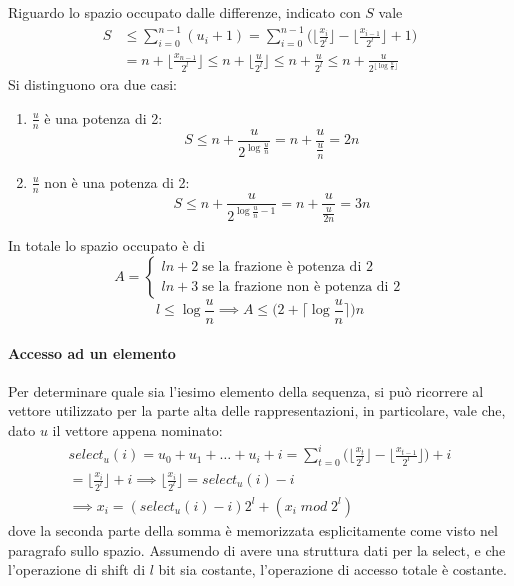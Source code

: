 Riguardo lo spazio occupato dalle differenze, indicato con $S$ vale
\begin{equation}
    \begin{aligned}
        S &\leq \sum_{i=0}^{n-1} ( u_i + 1) = \sum_{i=0}^{n-1} \bigg( \bigg\lfloor \frac{x_i}{2^l} 
        \bigg\rfloor -\bigg\lfloor \frac{x_{i-1}}{2^l} \bigg\rfloor  + 1\bigg) \\&=
        n + \bigg\lfloor \frac{x_{n-1}}{2^l} \bigg\rfloor \leq n + \bigg\lfloor \frac{u}{2^l} \bigg\rfloor
        \leq n + \frac{u}{2^l} \leq n + \frac{u}{2^{\lfloor\log \frac{u}{n}\rfloor}}
    \end{aligned}
\end{equation}
Si distinguono ora due casi:
\begin{enumerate}
    \item $\frac{u}{n}$ è una potenza di 2:
        $$S \leq n + \frac{u}{2^{\log \frac{u}{n}}} = n + \frac{u}{\frac{u}{n}} = 2n$$
    \item $\frac{u}{n}$ non è una potenza di 2:
         $$S \leq n + \frac{u}{2^{\log \frac{u}{n} -1}} = n + \frac{u}{\frac{u}{2n}} = 3n$$
\end{enumerate}
In totale lo spazio occupato è di
\[A =\begin{cases}
    ln +2\;\text{se la frazione è potenza di 2}\\
    ln + 3\;\text{se la frazione non è potenza di 2}
\end{cases}\]
$$l \leq \log\frac{u}{n} \implies 
A \leq \bigg( 2 + \bigg\lceil \log \frac{u}{n}\bigg\rceil\bigg)n$$

\paragraph{Accesso ad un elemento}
Per determinare quale sia l'iesimo elemento della sequenza, 
si può ricorrere al vettore utilizzato per la parte alta delle rappresentazioni, 
in particolare, vale che, dato $u$ il vettore appena nominato: 
\begin{equation}
    \begin{aligned}
        \mathit{select}_u(i) = u_0 + u_1 + \dots + u_i + i 
        = \sum_{t=0}^i \bigg(\bigg\lfloor \frac{x_t}{2^l}\bigg\rfloor - 
        \bigg\lfloor \frac{x_{t-1}}{2^l}\bigg\rfloor \bigg) + i \\= 
        \bigg\lfloor \frac{x_i}{2^l}\bigg\rfloor + i \implies 
        \bigg\lfloor \frac{x_i}{2^l}\bigg\rfloor =  \mathit{select}_u(i) - i\\
        \implies x_i = (\mathit{select}_u(i) - i)2^l + (x_i \; \mathit{mod}\;2^l)
    \end{aligned}
\end{equation}
dove la seconda parte della somma è memorizzata esplicitamente come visto nel paragrafo 
sullo spazio. Assumendo di avere una struttura dati per la select, e che l'operazione 
di shift di $l$ bit sia costante, l'operazione di accesso totale è costante.

